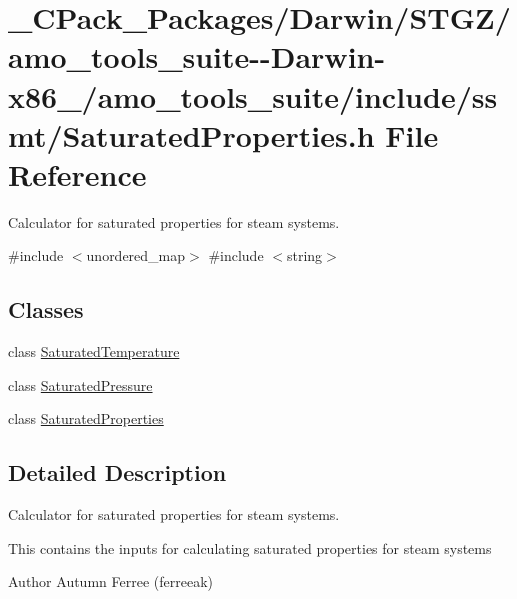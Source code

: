 \hypertarget{___c_pack___packages_2_darwin_2_s_t_g_z_2amo__tools__suite--_darwin-x86__64_2amo__tools__suite_2b97ccf799ea6561aa4d6a618c8073459}{}\section{\+\_\+\+C\+Pack\+\_\+\+Packages/\+Darwin/\+S\+T\+G\+Z/amo\+\_\+tools\+\_\+suite-\/-\/\+Darwin-\/x86\+\_/amo\+\_\+tools\+\_\+suite/include/ssmt/\+Saturated\+Properties.h File Reference}
\label{___c_pack___packages_2_darwin_2_s_t_g_z_2amo__tools__suite--_darwin-x86__64_2amo__tools__suite_2b97ccf799ea6561aa4d6a618c8073459}


Calculator for saturated properties for steam systems.  


{\ttfamily \#include $<$unordered\+\_\+map$>$}\newline
{\ttfamily \#include $<$string$>$}\newline
\subsection*{Classes}
\begin{DoxyCompactItemize}
\item 
class \hyperlink{class_saturated_temperature}{Saturated\+Temperature}
\item 
class \hyperlink{class_saturated_pressure}{Saturated\+Pressure}
\item 
class \hyperlink{class_saturated_properties}{Saturated\+Properties}
\end{DoxyCompactItemize}


\subsection{Detailed Description}
Calculator for saturated properties for steam systems. 

This contains the inputs for calculating saturated properties for steam systems

\begin{DoxyAuthor}{Author}
Autumn Ferree (ferreeak) 
\end{DoxyAuthor}
